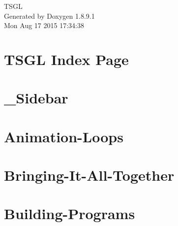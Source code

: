 \documentclass[twoside]{book}
\newcommand{\+}{\discretionary{\mbox{\scriptsize$\hookleftarrow$}}{}{}}
\newcommand{\clearemptydoublepage}{%
  \newpage{\pagestyle{empty}\cleardoublepage}%
}
\begin{document}
\hypersetup{pageanchor=false,
             bookmarks=true,
             bookmarksnumbered=true,
             pdfencoding=unicode
            }
\begin{titlepage}
\vspace*{7cm}
\begin{center}%
{\Large T\+S\+G\+L }\\
\vspace*{1cm}
{\large Generated by Doxygen 1.8.9.1}\\
\vspace*{0.5cm}
{\small Mon Aug 17 2015 17:34:38}\\
\end{center}
\end{titlepage}
\clearemptydoublepage
\tableofcontents
\clearemptydoublepage
{}
\hypersetup{pageanchor=true}

\chapter{T\+S\+G\+L Index Page}
\label{index}\hypertarget{index}{}
\chapter{\+\_\+\+Sidebar}
\label{md__home_pretzel_workspace_tsgl__t_s_g_l_docs-wiki___sidebar}
\hypertarget{md__home_pretzel_workspace_tsgl__t_s_g_l_docs-wiki___sidebar}{}

\chapter{Animation-\/\+Loops}
\label{md__home_pretzel_workspace_tsgl__t_s_g_l_docs-wiki__animation-_loops}
\hypertarget{md__home_pretzel_workspace_tsgl__t_s_g_l_docs-wiki__animation-_loops}{}

\chapter{Bringing-\/\+It-\/\+All-\/\+Together}
\label{md__home_pretzel_workspace_tsgl__t_s_g_l_docs-wiki__bringing-_it-_all-_together}
\hypertarget{md__home_pretzel_workspace_tsgl__t_s_g_l_docs-wiki__bringing-_it-_all-_together}{}

\chapter{Building-\/\+Programs}
\label{md__home_pretzel_workspace_tsgl__t_s_g_l_docs-wiki__building-_programs}
\hypertarget{md__home_pretzel_workspace_tsgl__t_s_g_l_docs-wiki__building-_programs}{}

\end{document}
